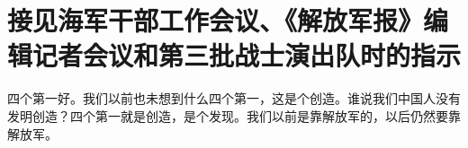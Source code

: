 \section[接见海军干部工作会议、《解放军报》编辑记者会议和第三批战士演出队时的指示（一九六五年二月二十二日）]{接见海军干部工作会议、《解放军报》编辑记者会议和第三批战士演出队时的指示}


四个第一好。我们以前也未想到什么四个第一，这是个创造。谁说我们中国人没有发明创造？四个第一就是创造，是个发现。我们以前是靠解放军的，以后仍然要靠解放军。

